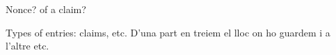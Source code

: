 
Nonce? of a claim?

Types of entries: claims, etc. D'una part en treiem el lloc on ho guardem i a l'altre etc.
